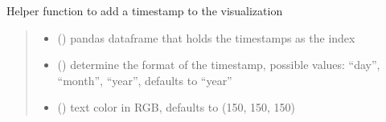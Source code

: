 \documentclass[letterpaper,10pt,english]{sphinxmanual}
\begin{document}
\begin{fulllineitems}
\begin{fulllineitems}
\end{fulllineitems}


\begin{fulllineitems}
\label{\detokenize{index:sjvisualizer.Canvas.canvas.add_time}}
\pysigstartsignatures
{}
\pysigstopsignatures
\sphinxAtStartPar
Helper function to add a timestamp to the visualization
\begin{quote}\begin{description}
\begin{itemize}
\item {} 
\sphinxAtStartPar
{} () \textendash{} pandas dataframe that holds the timestamps as the index

\item {} 
\sphinxAtStartPar
{} () \textendash{} determine the format of the timestamp, possible values: “day”, “month”, “year”, defaults to “year”

\item {} 
\sphinxAtStartPar
{} () \textendash{} text color in RGB, defaults to (150, 150, 150)

\end{itemize}

\end{description}\end{quote}

\end{fulllineitems}



\end{fulllineitems}
\end{document}
